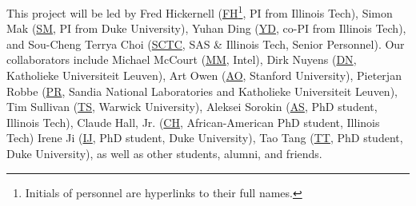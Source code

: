 \documentclass[11pt]{NSFamsart}
\newcommand{\cmtS}[1]{{\color{blue}{(Simon: #1)}}}
\newcommand{\FH}{\hyperlink{FHlink}{FH}\xspace}
\newcommand{\SM}{\hyperlink{SMlink}{SM}\xspace}
\newcommand{\SCTC}{\hyperlink{SCTClink}{SCTC}\xspace}
\newcommand{\AO}{\hyperlink{AOlink}{AO}\xspace}
\newcommand{\MM}{\hyperlink{MMlink}{MM}\xspace}
\newcommand{\CH}{\hyperlink{CHlink}{CH}\xspace}
\newcommand{\TS}{\hyperlink{TSlink}{TS}\xspace}
\newcommand{\IJi}{\hyperlink{IJlink}{IJ}\xspace}
\newcommand{\TT}{\hyperlink{TTlink}{TT}\xspace}
\newcommand{\YD}{\hyperlink{YDlink}{YD}\xspace}
\newcommand{\AS}{\hyperlink{ASlink}{AS}\xspace}
\newcommand{\PR}{\hyperlink{PRlink}{PR}\xspace}
\newcommand{\DN}{\hyperlink{DNlink}{DN}\xspace}
\begin{document}
This project will be led by 
\hypertarget{FHlink}{Fred Hickernell} (\FH\footnote{Initials of personnel are hyperlinks to their full names.}, PI from Illinois Tech), 
\hypertarget{SMlink}{Simon Mak} (\SM, PI from Duke University), 
\hypertarget{YDlink}{Yuhan Ding} (\YD, co-PI from Illinois Tech), and 
\hypertarget{SCTClink}{Sou-Cheng Terrya Choi} (\SCTC, SAS \& Illinois Tech, Senior Personnel).  
Our collaborators include  
\hypertarget{MMlink}{Michael McCourt} (\MM, Intel), 
\hypertarget{DNlink}{Dirk Nuyens} (\DN,  Katholieke Universiteit Leuven),
\hypertarget{AOlink}{Art Owen} (\AO, Stanford University), 
\hypertarget{PRlink}{Pieterjan Robbe} (\PR, Sandia National Laboratories and Katholieke Universiteit Leuven),  
\hypertarget{TSlink}{Tim Sullivan} (\TS, Warwick University), 
\hypertarget{ASlink}{Aleksei Sorokin} (\AS, PhD student, Illinois Tech),
\hypertarget{CHlink}{Claude Hall, Jr.} (\CH, African-American PhD student, Illinois Tech)
\hypertarget{IJlink}{Irene Ji} (\IJi, PhD student, Duke University), 
\hypertarget{TTlink}{Tao Tang} (\TT, PhD student, Duke University), as well as other students, alumni, and friends. \cmtS{to modify}

 

\end{document}

